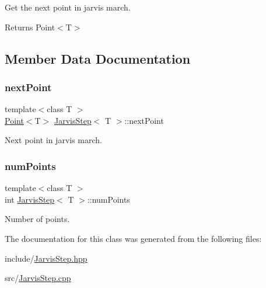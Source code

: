 Get the next point in jarvis march. 

\begin{DoxyReturn}{Returns}
Point$<$\+T$>$ 
\end{DoxyReturn}


\subsection{Member Data Documentation}
\mbox{\label{classJarvisStep_a35b1bc8bd742976a76dd47a5850f67fa}} 
\subsubsection{\texorpdfstring{next\+Point}{nextPoint}}
{\footnotesize\ttfamily template$<$class T $>$ \\
\mbox{\hyperlink{classPoint}{Point}}$<$T$>$ \mbox{\hyperlink{classJarvisStep}{Jarvis\+Step}}$<$ T $>$\+::next\+Point\hspace{0.3cm}{\ttfamily [private]}}



Next point in jarvis march. 

\mbox{\label{classJarvisStep_acda18cb9b72668a839239761aeedd7fa}} 
\subsubsection{\texorpdfstring{num\+Points}{numPoints}}
{\footnotesize\ttfamily template$<$class T $>$ \\
int \mbox{\hyperlink{classJarvisStep}{Jarvis\+Step}}$<$ T $>$\+::num\+Points\hspace{0.3cm}{\ttfamily [private]}}



Number of points. 



The documentation for this class was generated from the following files\+:\begin{DoxyCompactItemize}
\item 
include/\mbox{\hyperlink{JarvisStep_8hpp}{Jarvis\+Step.\+hpp}}\item 
src/\mbox{\hyperlink{JarvisStep_8cpp}{Jarvis\+Step.\+cpp}}\end{DoxyCompactItemize}
